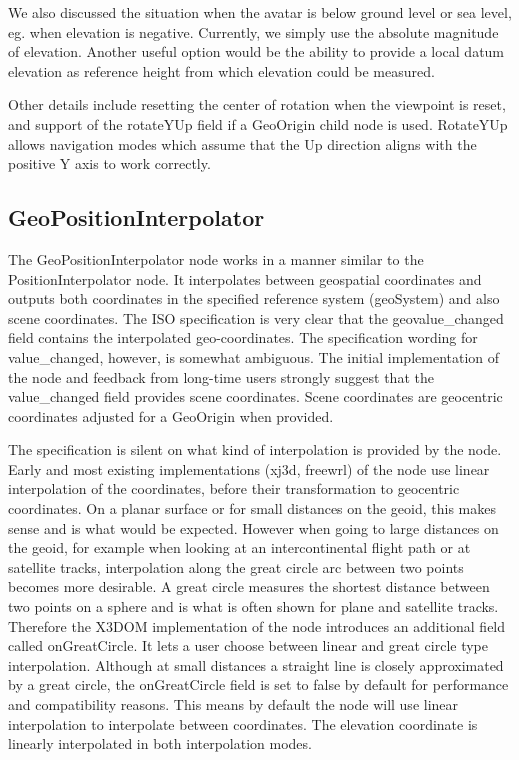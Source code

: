 \documentclass[review]{acmsiggraph}            %
\begin{document}
We also discussed the situation when the avatar is below ground level or sea level, eg. when
elevation is negative. Currently, we simply use the absolute magnitude of elevation. Another useful
option would be the ability to provide a local datum elevation as reference height from which
elevation could be measured.

Other details include resetting the center of rotation when the viewpoint is reset, and support of
the rotateYUp field if a GeoOrigin child node is used. RotateYUp allows navigation modes which
assume that the Up direction aligns with the positive Y axis to work correctly.


\subsection{GeoPositionInterpolator}

The GeoPositionInterpolator node works in a manner similar to the PositionInterpolator node. It interpolates
between geospatial coordinates and outputs both coordinates in the specified reference system
(geoSystem) and also scene coordinates. The ISO specification is very clear that the
geovalue\_changed field contains the interpolated geo-coordinates. The specification wording for
value\_changed, however, is somewhat ambiguous. The initial implementation of the node
\cite{reddy2000} and feedback from long-time users strongly suggest that the value\_changed field
provides scene coordinates. Scene coordinates are geocentric coordinates adjusted for a GeoOrigin
when provided.

The specification is silent on what kind of interpolation is provided by the node. Early
\cite{reddy2000} and most existing implementations (xj3d, freewrl) of the node use linear
interpolation of the coordinates, before their transformation to geocentric coordinates. On a planar
surface or for small distances on the geoid, this makes sense and is what would be expected. However when going
to large distances on the geoid, for example when looking at an intercontinental flight path or at
satellite tracks, interpolation along the great circle arc between two points becomes more
desirable. A great circle measures the shortest distance between two points on a sphere and is what
is often shown for plane and satellite tracks. Therefore the X3DOM implementation of the node
introduces an additional field called onGreatCircle. It lets a user choose between linear and great
circle type interpolation. Although at small distances a  straight line is closely approximated by a
great circle, the onGreatCircle field is set to false by default for performance and compatibility
reasons. This means by default the node will use linear interpolation to interpolate between
coordinates. The elevation coordinate is linearly interpolated in both interpolation modes.
\end{document}
